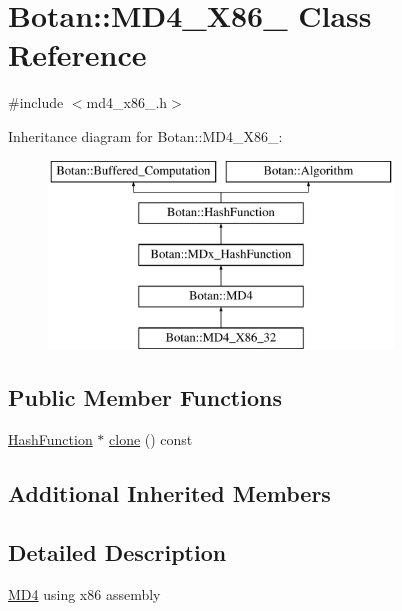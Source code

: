 \hypertarget{classBotan_1_1MD4__X86__32}{\section{Botan\-:\-:M\-D4\-\_\-\-X86\-\_ Class Reference}
\label{classBotan_1_1MD4__X86__32}
}


{\ttfamily \#include $<$md4\-\_\-x86\-\_.\-h$>$}

Inheritance diagram for Botan\-:\-:M\-D4\-\_\-\-X86\-\_\-:\begin{figure}[H]
\begin{center}
\leavevmode
\includegraphics[height=5.000000cm]{classBotan_1_1MD4__X86__32}
\end{center}
\end{figure}
\subsection*{Public Member Functions}
\begin{DoxyCompactItemize}
\item 
\hyperlink{classBotan_1_1HashFunction}{Hash\-Function} $\ast$ \hyperlink{classBotan_1_1MD4__X86__32_a8f248a91d448175ba3d7c426cc6a03cb}{clone} () const 
\end{DoxyCompactItemize}
\subsection*{Additional Inherited Members}


\subsection{Detailed Description}
\hyperlink{classBotan_1_1MD4}{M\-D4} using x86 assembly 

